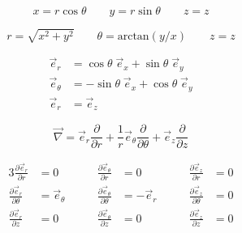 \documentclass[times,namecite]{goose-article}
\begin{document}
\begin{equation}
  x = r \cos \theta \qquad
  y = r \sin \theta \qquad
  z = z
\end{equation}

\begin{equation}
  r      = \sqrt{ x^2 + y^2 }                \qquad
  \theta = \mathrm{arctan}\left( y/x \right) \qquad
  z      = z
\end{equation}

\begin{align}
  \vec{e}_r      &=   \cos \theta \; \vec{e}_x + \sin \theta \; \vec{e}_y \nonumber \\
  \vec{e}_\theta &= - \sin \theta \; \vec{e}_x + \cos \theta \; \vec{e}_y \nonumber \\
  \vec{e}_r      &= \vec{e}_z
\end{align}





\begin{equation}
  \vec{\nabla} =
  \vec{e}_r \frac{\partial}{\partial r} +
  \frac{1}{r} \vec{e}_\theta \frac{\partial}{\partial \theta} +
  \vec{e}_z \frac{\partial}{\partial z}
\end{equation}

\begin{alignat}{3}
  \frac{\partial \vec{e}_r}{\partial r     } &= 0              &\qquad \frac{\partial \vec{e}_\theta}{\partial r     } &= 0           &\qquad \frac{\partial \vec{e}_z}{\partial r     } &= 0 \nonumber \\
  \frac{\partial \vec{e}_r}{\partial \theta} &= \vec{e}_\theta &\qquad \frac{\partial \vec{e}_\theta}{\partial \theta} &= - \vec{e}_r &\qquad \frac{\partial \vec{e}_z}{\partial \theta} &= 0 \nonumber \\
  \frac{\partial \vec{e}_r}{\partial z     } &= 0              &\qquad \frac{\partial \vec{e}_\theta}{\partial z     } &= 0           &\qquad \frac{\partial \vec{e}_z}{\partial z     } &= 0
\end{alignat}
\end{document}
